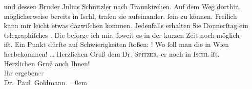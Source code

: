 \begin{ledgroupsized}[t]{13cm}
{{{                  und dessen Bruder Julius Schnitzler nach
                     Traunkirchen. Auf dem Weg dorthin,
                  möglicherweise bereits in Ischl, trafen sie
                  aufeinander.}}}\label{K_L02643-1h} ſein zu können. Freilich kann mir leicht etwas dazwiſchen
               kommen. Jedenfalls erhalten Sie Donnerſtag ein
               telegraphiſches \label{K_L02643-2v}\label{K_L02643-2h}.\pend
           \pstart
           Die \label{K_L02643-3v}\label{K_L02643-3h} beſorge ich mir,
               ſoweit es in der kurzen {\pb}Zeit noch möglich iſt. Ein
               Punkt dürfte auf Schwierigkeiten ſtoßen: \label{K_L02643-4v}\label{K_L02643-4h}! Wo ſoll man die in Wien
                  herbekommen! {\dots}\pend
           \pstart
           Herzlichen Gruß dem Dr. \textsc{Spitzer}, \label{K_L02643-11v}\label{K_L02643-11h} er noch in \textsc{Ischl} iſt.\pend
           \pstart
           Herzlichen Gruß auch Ihnen! {\\[\baselineskip]}Ihr ergeben\textcolor{gray}{er}{\\[\baselineskip]}\spacefill\mbox{Dr. Paul Goldmann.}\pend
           \leftskip=0em{}
         
         \endnumbering{}\end{ledgroupsized}  \newcommand{\dateiname}{L02643}\newcommand{\titel}{Paul Goldmann an Arthur Schnitzler, 6. 8. 1889}\newcommand{\editorInnen}{Martin Anton Müller und Laura Untner}
      